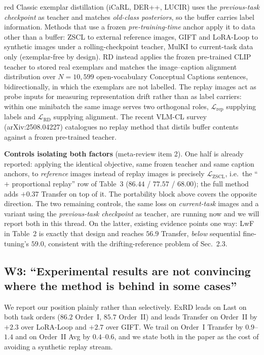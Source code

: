 \documentclass[11pt]{article}
\begin{document}
\begin{color}{red}
Classic exemplar distillation (iCaRL, DER++, LUCIR) uses the \emph{previous-task checkpoint} as teacher and matches \emph{old-class posteriors}, so the buffer carries label information. Methods that use a frozen \emph{pre-training-time} anchor apply it to data other than a buffer: ZSCL to external reference images, GIFT and LoRA-Loop to synthetic images under a rolling-checkpoint teacher, MulKI to current-task data only (exemplar-free by design). RD instead applies the frozen pre-trained CLIP teacher to stored real exemplars and matches the image--caption alignment distribution over $N{=}10{,}599$ open-vocabulary Conceptual Captions sentences, bidirectionally, in which the exemplars are not labelled. The replay images act as probe inputs for measuring representation drift rather than as label carriers: within one minibatch the same image serves two orthogonal roles, $\mathcal{L}_\text{rep}$ supplying labels and $\mathcal{L}_\text{RD}$ supplying alignment. The recent VLM-CL survey (arXiv:2508.04227) catalogues no replay method that distils buffer contents against a frozen pre-trained teacher.

\textbf{Controls isolating both factors} (meta-review item 2). One half is already reported: applying the identical objective, same frozen teacher and same caption anchors, to \emph{reference} images instead of replay images is precisely $\mathcal{L}_\text{ZSCL}$, i.e.\ the ``$+$ proportional replay'' row of Table~3 ($86.44$ / $77.57$ / $68.00$); the full method adds $+0.37$ Transfer on top of it. The portability block above covers the opposite direction. The two remaining controls, the same loss on \emph{current-task} images and a variant using the \emph{previous-task checkpoint} as teacher, are running now and we will report both in this thread. On the latter, existing evidence points one way: LwF in Table~2 is exactly that design and reaches $56.9$ Transfer, \emph{below} sequential fine-tuning's $59.0$, consistent with the drifting-reference problem of Sec.~2.3.

\subsection*{W3: ``Experimental results are not convincing where the method is behind in some cases''}

We report our position plainly rather than selectively. ExRD leads on Last on both task orders ($86.2$ Order~I, $85.7$ Order~II) and leads Transfer on Order~II by $+2.3$ over LoRA-Loop and $+2.7$ over GIFT. We trail on Order~I Transfer by $0.9$--$1.4$ and on Order~II Avg by $0.4$--$0.6$, and we state both in the paper as the cost of avoiding a synthetic replay stream.


\end{color}
\end{document}
